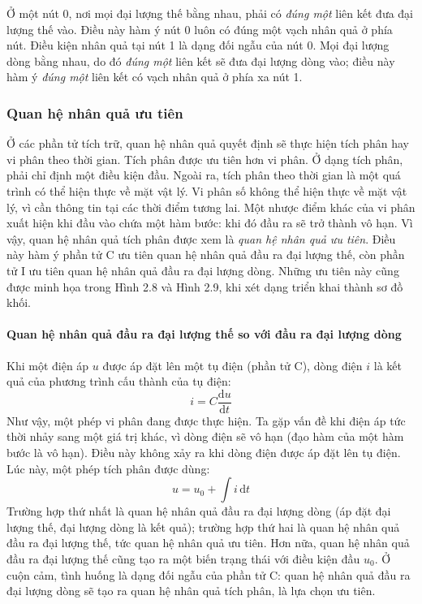 Ở một nút 0, nơi mọi đại lượng thế bằng nhau, phải có \emph{đúng một} liên kết đưa đại lượng thế vào. Điều này hàm ý nút 0 luôn có đúng một vạch nhân quả ở phía nút. Điều kiện nhân quả tại nút 1 là dạng đối ngẫu của nút 0. Mọi đại lượng dòng bằng nhau, do đó \emph{đúng một} liên kết sẽ đưa đại lượng dòng vào; điều này hàm ý \emph{đúng một} liên kết có vạch nhân quả ở phía xa nút 1.

\subsubsection{Quan hệ nhân quả ưu tiên}
Ở các phần tử tích trữ, quan hệ nhân quả quyết định sẽ thực hiện tích phân hay vi phân theo thời gian. Tích phân được ưu tiên hơn vi phân. Ở dạng tích phân, phải chỉ định một điều kiện đầu. Ngoài ra, tích phân theo thời gian là một quá trình có thể hiện thực về mặt vật lý. Vi phân số không thể hiện thực về mặt vật lý, vì cần thông tin tại các thời điểm tương lai. Một nhược điểm khác của vi phân xuất hiện khi đầu vào chứa một hàm bước: khi đó đầu ra sẽ trở thành vô hạn. Vì vậy, quan hệ nhân quả tích phân được xem là \emph{quan hệ nhân quả ưu tiên}. Điều này hàm ý phần tử C ưu tiên quan hệ nhân quả đầu ra đại lượng thế, còn phần tử I ưu tiên quan hệ nhân quả đầu ra đại lượng dòng. Những ưu tiên này cũng được minh họa trong Hình 2.8 và Hình 2.9, khi xét dạng triển khai thành sơ đồ khối.
\paragraph{Quan hệ nhân quả đầu ra đại lượng thế so với đầu ra đại lượng dòng}
Khi một điện áp $u$ được áp đặt lên một tụ điện (phần tử C), dòng điện $i$ là kết quả của phương trình cấu thành của tụ điện:
\[i=C\frac{\mathrm{d}u}{\mathrm{d}t}\]
Như vậy, một phép vi phân đang được thực hiện. Ta gặp vấn đề khi điện áp tức thời nhảy sang một giá trị khác, vì dòng điện sẽ vô hạn (đạo hàm của một hàm bước là vô hạn). Điều này không xảy ra khi dòng điện được áp đặt lên tụ điện. Lúc này, một phép tích phân được dùng:
\[u=u_0+\int i\,\mathrm{d}t\]
Trường hợp thứ nhất là quan hệ nhân quả đầu ra đại lượng dòng (áp đặt đại lượng thế, đại lượng dòng là kết quả); trường hợp thứ hai là quan hệ nhân quả đầu ra đại lượng thế, tức quan hệ nhân quả ưu tiên. Hơn nữa, quan hệ nhân quả đầu ra đại lượng thế cũng tạo ra một biến trạng thái với điều kiện đầu $u_0$. Ở cuộn cảm, tình huống là dạng đối ngẫu của phần tử C: quan hệ nhân quả đầu ra đại lượng dòng sẽ tạo ra quan hệ nhân quả tích phân, là lựa chọn ưu tiên.


